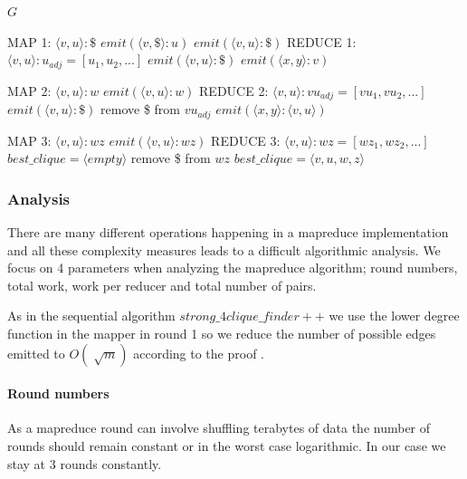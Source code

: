 \documentclass{article}
\begin{document}
\begin{algorithm}
\label{mrAlgorithm}
\caption{$mr\_strong\_4clique\_finder$}
\begin{algorithmic}
\REQUIRE $G$
	
\REQUIRE MAP 1: $\langle v,u\rangle :\$$
		\STATE $emit(\langle v,\$\rangle :u)$
		\STATE $emit(\langle v,u\rangle :\$)$
	\ENDIF
\REQUIRE REDUCE 1: $\langle v,u\rangle :u_{adj} = [u_1,u_2,...]$
		\STATE $emit(\langle v,u\rangle :\$)$
	\ENDIF
				\STATE $emit(\langle x,y\rangle :v)$
			\ENDIF
		\ENDFOR
	\ENDFOR

\REQUIRE MAP 2: $\langle v,u\rangle :w$
	\STATE $emit(\langle v,u\rangle :w)$
\REQUIRE REDUCE 2: $\langle v,u\rangle : vu_{adj} = [vu_1,vu_2,...]$
		\STATE $emit(\langle v,u\rangle : \$)$
		\STATE remove \$ from $vu_{adj}$
	\ENDIF
				\STATE $emit(\langle x,y\rangle :\langle v,u\rangle)$
			\ENDIF
		\ENDFOR
	\ENDFOR

\REQUIRE MAP 3: $\langle v,u\rangle :wz$
	\STATE $emit(\langle v,u\rangle :wz)$
\REQUIRE REDUCE 3: $\langle v,u\rangle :wz = [wz_1,wz_2,...]$
	\STATE $best\_clique = \langle empty\rangle $
	\STATE remove \$ from $wz$
				\STATE $best\_clique = \langle v,u,w,z\rangle$
			\ENDIF
		\ENDFOR
	\ENDIF
\end{algorithmic}
\end{algorithm}

\subsubsection{Analysis}
There are many different operations happening in a mapreduce implementation and all these complexity measures leads to a difficult algorithmic analysis. We focus on 4 parameters when analyzing the mapreduce algorithm; round numbers, total work, work per reducer and total number of pairs.

As in the sequential algorithm $strong\_4clique\_finder++$ we use the lower degree function in the mapper in round 1 so we reduce the number of possible edges emitted to $O(\sqrt[]{m})$ according to the proof \cite{AlgorithmicAspects}.

\paragraph{Round numbers}
As a mapreduce round can involve shuffling terabytes of data the number of rounds should remain constant or in the worst case logarithmic. In our case we stay at 3 rounds constantly.
\end{document}
